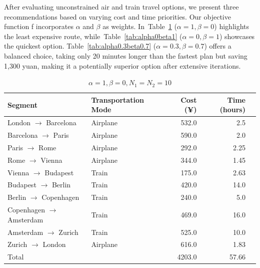 \documentclass{article}
\begin{document}
After evaluating unconstrained air and train travel options, we present three recommendations based on varying cost and time priorities. Our objective function f incorporates $\alpha$ and $\beta$ as weights. In~Table~\ref{tab:alpha1beta0} ($\alpha = 1, \beta = 0$) highlights the least expensive route, while~Table~\ref{tab:alpha0beta1} ($\alpha = 0, \beta = 1$) showcases the quickest option. Table~\ref{tab:alpha0.3beta0.7} ($\alpha = 0.3, \beta = 0.7$) offers a balanced choice, taking only 20 minutes longer than the fastest plan but saving 1,300 yuan, making it a potentially superior option after extensive iterations.

\begin{table}[!ht]
  \centering
  \begin{tabular}{llrrr}
    \toprule
    Segment                          & Transportation Mode & Cost (¥) & Time (hours) \\
    \midrule
    London $\rightarrow$  Barcelona  & Airplane            & 532.0    & 2.5          \\
    Barcelona $\rightarrow$  Paris   & Airplane            & 590.0    & 2.0          \\
    Paris $\rightarrow$  Rome        & Airplane            & 292.0    & 2.25         \\
    Rome $\rightarrow$  Vienna       & Airplane            & 344.0    & 1.45         \\
    Vienna $\rightarrow$  Budapest   & Train               & 175.0    & 2.63         \\
    Budapest $\rightarrow$  Berlin   & Train               & 420.0    & 14.0         \\
    Berlin $\rightarrow$  Copenhagen & Train               & 240.0    & 5.0          \\
    Copenhagen $\rightarrow$  Amsterdam & Train            & 469.0    & 16.0         \\
    Amsterdam $\rightarrow$  Zurich  & Train               & 525.0    & 10.0         \\
    Zurich $\rightarrow$  London     & Airplane            & 616.0    & 1.83         \\
    \midrule
    Total                            &                     & 4203.0   & 57.66         \\
    \bottomrule
  \end{tabular}
  \caption{$\alpha=1, \beta=0, N_1=N_2=10$}%
  \label{tab:alpha1beta0}
\end{table}
\end{document}
